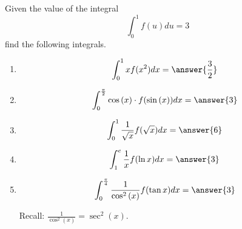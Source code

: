 \documentclass{ximera}
\author{Nela Lakos \and Kyle Parsons}
\begin{document}
\begin{exercise}
Given the value of the integral
 \[
 \int_0^1 f(u) du=3
 \]
 find the following integrals.
\begin{enumerate}
\item 
\[
\int_0^1 x f(x^2) dx=\answer{\frac{3}{2}}
\]
\item 
\[
\int_0^{\frac{\pi}{2}} \cos{(x)} \cdot f(\sin{(x)}) dx=\answer{3}
\]
\item 
\[
\int_0^1 \frac{1}{\sqrt{x}} f(\sqrt{x}) dx=\answer{6}
\]
\item 
\[
\int_1^e \frac{1}{x} f(\ln{x}) dx=\answer{3}
\]
\item 
\[
\int_0^{\frac{\pi}{4}} \frac{1}{\cos^2{(x)}} f(\tan{x}) dx=\answer{3}
\]
\begin{hint}
Recall: $\frac{1}{\cos^2{(x)}} =\sec^2{(x)}$.
\end{hint}
\end{enumerate}
\end{exercise}
\end{document}
